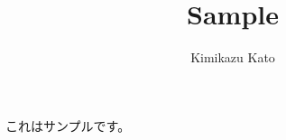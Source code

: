 \documentclass{article}
\title{Sample}
\author{Kimikazu Kato}
\begin{document}
\maketitle
これはサンプルです。
\end{document}

